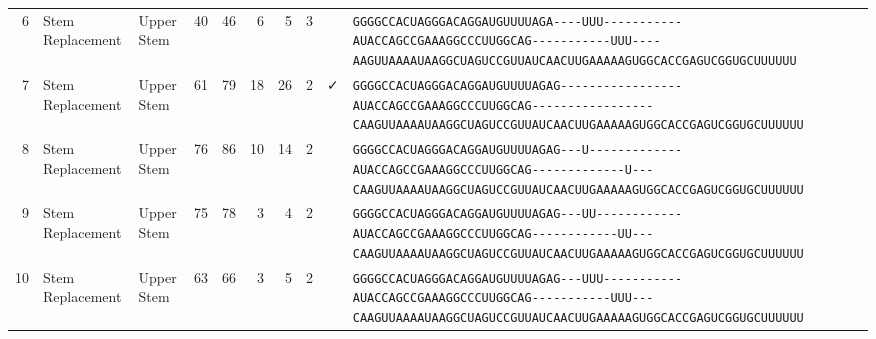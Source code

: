 \begin{tabular}{rllrrrrrcl}
 6 & Stem Replacement & Upper Stem & 40 & 46 & 6 & 5 & 3 &  &
 \color{ucsfdarkgrey}\verb|GGGGCCACUAGGGACAGGAU|\color{ucsforange}\verb|GUUUUA|\color{ucsfblue}\verb|GA----UUU-----------|\color{ucsfpurple}\verb|AUACCAGCCGAAAGGCCCUUGGCAG|\color{ucsfblue}\verb|-----------UUU----AAGU|\color{ucsforange}\verb|UAAAAUAA|\color{ucsfnavy}\verb|GGCUAGUCC|\color{ucsforange}\verb|GUUAUCA|\color{ucsfteal}\verb|ACUUGAAAAAGUG|\color{ucsforange}\verb|GCACCGAGUCGGUGCUUUUUU| \\

 7 & Stem Replacement & Upper Stem & 61 & 79 & 18 & 26 & 2 & ✓ &
 \color{ucsfdarkgrey}\verb|GGGGCCACUAGGGACAGGAU|\color{ucsforange}\verb|GUUUUA|\color{ucsfblue}\verb|GAG-----------------|\color{ucsfpurple}\verb|AUACCAGCCGAAAGGCCCUUGGCAG|\color{ucsfblue}\verb|-----------------CAAGU|\color{ucsforange}\verb|UAAAAUAA|\color{ucsfnavy}\verb|GGCUAGUCC|\color{ucsforange}\verb|GUUAUCA|\color{ucsfteal}\verb|ACUUGAAAAAGUG|\color{ucsforange}\verb|GCACCGAGUCGGUGCUUUUUU| \\

 8 & Stem Replacement & Upper Stem & 76 & 86 & 10 & 14 & 2 &  &
 \color{ucsfdarkgrey}\verb|GGGGCCACUAGGGACAGGAU|\color{ucsforange}\verb|GUUUUA|\color{ucsfblue}\verb|GAG---U-------------|\color{ucsfpurple}\verb|AUACCAGCCGAAAGGCCCUUGGCAG|\color{ucsfblue}\verb|-------------U---CAAGU|\color{ucsforange}\verb|UAAAAUAA|\color{ucsfnavy}\verb|GGCUAGUCC|\color{ucsforange}\verb|GUUAUCA|\color{ucsfteal}\verb|ACUUGAAAAAGUG|\color{ucsforange}\verb|GCACCGAGUCGGUGCUUUUUU| \\

 9 & Stem Replacement & Upper Stem & 75 & 78 & 3 & 4 & 2 &  &
 \color{ucsfdarkgrey}\verb|GGGGCCACUAGGGACAGGAU|\color{ucsforange}\verb|GUUUUA|\color{ucsfblue}\verb|GAG---UU------------|\color{ucsfpurple}\verb|AUACCAGCCGAAAGGCCCUUGGCAG|\color{ucsfblue}\verb|------------UU---CAAGU|\color{ucsforange}\verb|UAAAAUAA|\color{ucsfnavy}\verb|GGCUAGUCC|\color{ucsforange}\verb|GUUAUCA|\color{ucsfteal}\verb|ACUUGAAAAAGUG|\color{ucsforange}\verb|GCACCGAGUCGGUGCUUUUUU| \\

 10 & Stem Replacement & Upper Stem & 63 & 66 & 3 & 5 & 2 &  &
 \color{ucsfdarkgrey}\verb|GGGGCCACUAGGGACAGGAU|\color{ucsforange}\verb|GUUUUA|\color{ucsfblue}\verb|GAG---UUU-----------|\color{ucsfpurple}\verb|AUACCAGCCGAAAGGCCCUUGGCAG|\color{ucsfblue}\verb|-----------UUU---CAAGU|\color{ucsforange}\verb|UAAAAUAA|\color{ucsfnavy}\verb|GGCUAGUCC|\color{ucsforange}\verb|GUUAUCA|\color{ucsfteal}\verb|ACUUGAAAAAGUG|\color{ucsforange}\verb|GCACCGAGUCGGUGCUUUUUU| \\


\end{tabular}
